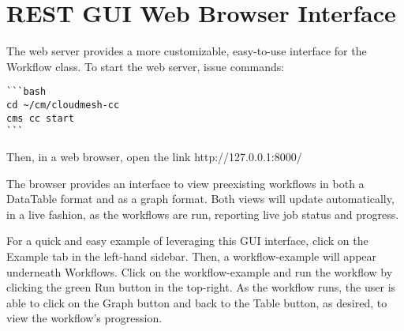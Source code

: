 \section{REST GUI Web Browser
Interface}\label{rest-gui-web-browser-interface}

The web server provides a more customizable, easy-to-use interface for
the Workflow class. To start the web server, issue commands:

\begin{verbatim}
```bash
cd ~/cm/cloudmesh-cc
cms cc start
```
\end{verbatim}

Then, in a web browser, open the link http://127.0.0.1:8000/

The browser provides an interface to view preexisting workflows in both
a DataTable format and as a graph format. Both views will update
automatically, in a live fashion, as the workflows are run, reporting
live job status and progress.

For a quick and easy example of leveraging this GUI interface, click on
the Example tab in the left-hand sidebar. Then, a workflow-example will
appear underneath Workflows. Click on the workflow-example and run the
workflow by clicking the green Run button in the top-right. As the
workflow runs, the user is able to click on the Graph button and back to
the Table button, as desired, to view the workflow's progression.
